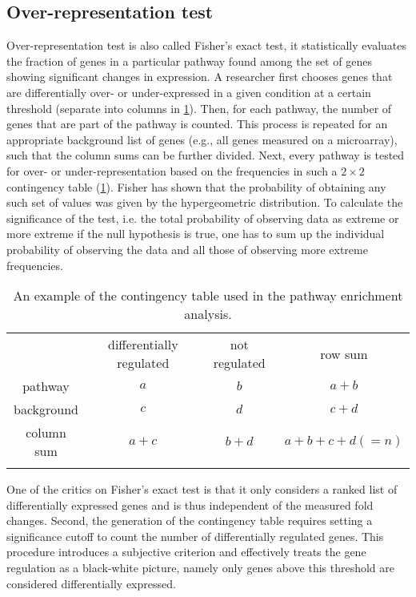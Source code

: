 \subsection{Over-representation test}
Over-representation test is also called Fisher's exact test, it statistically 
evaluates the fraction of genes in a particular pathway found among the set 
of genes showing significant changes in expression. 
A researcher first chooses genes that are 
differentially over- or under-expressed in a given condition at a certain 
threshold (separate into columns in \ref{table:contigency_table}). Then, for each pathway, the number of genes that are part of the 
pathway is counted. This process is repeated for an appropriate background 
list of genes (e.g., all genes measured on a microarray), 
such that the column sums can be further divided. 
Next, every pathway 
is tested for over- or under-representation based on the frequencies in such 
a $2 \times 2$ contingency table (\ref{table:contigency_table}). 
Fisher has shown that the probability of obtaining any such set of values was 
given by the hypergeometric distribution. To calculate the significance of the
test, i.e. the total probability of observing data as extreme or more extreme 
if the null hypothesis is true, one has to sum up the individual probability
of observing the data and all those of observing more extreme frequencies.

\begin{longtable}{cccc}
\caption[Contingency table example]{
An example of the contingency table used in the pathway enrichment analysis.} \\
\hline
& differentially regulated & not regulated & row sum \\
\rowcolor{Gray} pathway & $a$ & $b$ & $a+b$\\
background & $c$ & $d$ & $c+d$\\
\rowcolor{Gray} column sum & $a+c$ & $b+d$ & $a+b+c+d(=n)$\\
\hline
\label{table:contigency_table}
\end{longtable}

One of the critics on Fisher's exact test is that it only considers a ranked
list of differentially expressed genes and is thus independent of the 
measured fold changes. Second, the generation of the contingency table
requires setting a significance cutoff to count the number of differentially
regulated genes. This procedure introduces a subjective criterion and 
effectively treats the gene regulation as a black-white picture, namely only 
genes above this threshold are considered differentially expressed.
    
